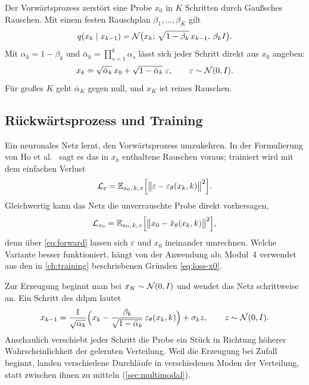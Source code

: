 Der Vorwärtsprozess zerstört eine Probe $x_0$ in $K$ Schritten durch Gaußsches Rauschen.
Mit einem festen Rauschplan $\beta_1, \dots, \beta_K$ gilt
\begin{equation}
  q(x_k \mid x_{k-1}) = \mathcal{N}\bigl(x_k;\, \sqrt{1-\beta_k}\,x_{k-1},\, \beta_k I\bigr) .
\end{equation}
Mit $\alpha_k = 1 - \beta_k$ und $\bar\alpha_k = \prod_{s=1}^{k}\alpha_s$ lässt sich jeder
Schritt direkt aus $x_0$ angeben:
\begin{equation}
  x_k = \sqrt{\bar\alpha_k}\,x_0 + \sqrt{1-\bar\alpha_k}\;\varepsilon,
  \qquad \varepsilon \sim \mathcal{N}(0, I) .
  \label{eq:forward}
\end{equation}
Für großes $K$ geht $\bar\alpha_K$ gegen null, und $x_K$ ist reines Rauschen.

\subsection{Rückwärtsprozess und Training}

Ein neuronales Netz lernt, den Vorwärtsprozess umzukehren. In der Formulierung von Ho et
al.~\cite{ho2020} sagt es das in $x_k$ enthaltene Rauschen voraus; trainiert wird mit dem
einfachen Verlust
\begin{equation}
  \mathcal{L}_\varepsilon = \mathbb{E}_{x_0,\,k,\,\varepsilon}
    \Bigl[\bigl\lVert \varepsilon - \varepsilon_\theta(x_k, k) \bigr\rVert^2\Bigr] .
  \label{eq:loss-eps}
\end{equation}
Gleichwertig kann das Netz die unverrauschte Probe direkt vorhersagen,
\begin{equation}
  \mathcal{L}_{x_0} = \mathbb{E}_{x_0,\,k,\,\varepsilon}
    \Bigl[\bigl\lVert x_0 - \hat x_\theta(x_k, k) \bigr\rVert^2\Bigr],
  \label{eq:loss-x0}
\end{equation}
denn über \cref{eq:forward} lassen sich $\varepsilon$ und $x_0$ ineinander umrechnen. Welche
Variante besser funktioniert, hängt von der Anwendung ab; Modul~4 verwendet aus den in
\cref{ch:training} beschriebenen Gründen \cref{eq:loss-x0}.

Zur Erzeugung beginnt man bei $x_K \sim \mathcal{N}(0, I)$ und wendet das Netz schrittweise an. Ein
Schritt des \ac{ddpm} lautet
\begin{equation}
  x_{k-1} = \frac{1}{\sqrt{\alpha_k}}
    \Bigl( x_k - \frac{\beta_k}{\sqrt{1-\bar\alpha_k}}\,\varepsilon_\theta(x_k, k) \Bigr)
    + \sigma_k z, \qquad z \sim \mathcal{N}(0, I) .
  \label{eq:ddpm-step}
\end{equation}
Anschaulich verschiebt jeder Schritt die Probe ein Stück in Richtung höherer
Wahrscheinlichkeit der gelernten Verteilung. Weil die Erzeugung bei Zufall beginnt, landen
verschiedene Durchläufe in verschiedenen Moden der Verteilung, statt zwischen ihnen zu mitteln
(\cref{sec:multimodal}).

